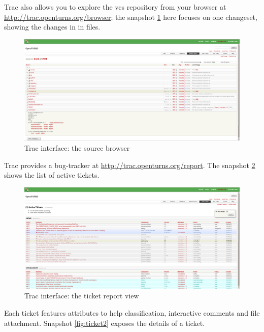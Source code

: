 Trac also allows you to explore the vcs repository from your browser at \url{http://trac.openturns.org/browser}; the snapshot \ref{fig:browser} here focuses on one changeset, showing the changes in in files.

\begin{figure}[ht]
\begin{center}
\includegraphics[scale=0.33]{Figures/BrowseSource.png}
\caption{Trac interface: the source browser}\label{fig:browser}
\end{center}

\end{figure}

Trac provides a bug-tracker at \url{http://trac.openturns.org/report}. The snapshot \ref{fig:ticket1} shows the list of active tickets.

\begin{figure}[ht]
\begin{center}
\includegraphics[scale=0.33]{Figures/Tickets1.png}
\caption{Trac interface: the ticket report view}\label{fig:ticket1}
\end{center}

\end{figure}

Each ticket features attributes to help classification, interactive comments and file attachment. Snapshot \ref{fig:ticket2} exposes the details of a ticket.

